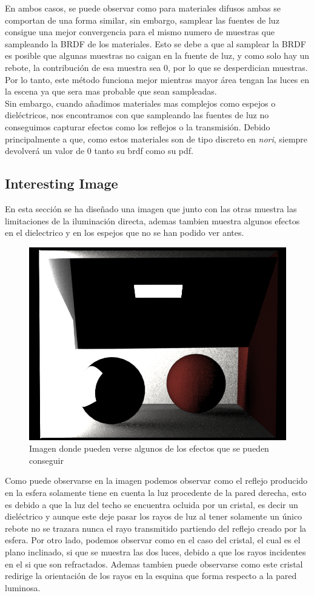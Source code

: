 \documentclass[10pt,oneside,a4paper]{article}
\begin{document}
 En ambos casos, se puede observar como para materiales difusos ambas se comportan de una forma similar, sin embargo, samplear las fuentes de luz consigue una mejor convergencia para el mismo numero de muestras que sampleando la BRDF de los materiales. Esto se debe a que al samplear la BRDF es posible que algunas muestras no caigan en la fuente de luz, y como solo hay un rebote, la contribución de esa muestra sea 0, por lo que se desperdician muestras. Por lo tanto, este método funciona mejor mientras mayor área tengan las luces en la escena ya que sera mas probable que sean sampleadas.\\
 
Sin embargo, cuando añadimos materiales mas complejos como espejos o dieléctricos, nos encontramos con que sampleando las fuentes de luz no conseguimos capturar efectos como los reflejos o la transmisión. Debido principalmente a que, como estos materiales son de tipo discreto en \textit{nori}, siempre devolverá un valor de 0 tanto su brdf como su pdf.\\
 
 \subsection{Interesting Image}
 En esta sección se ha diseñado una imagen que junto con las otras muestra las limitaciones de la iluminación directa, ademas tambien muestra algunos efectos en el dielectrico y en los espejos que no se han podido ver antes.\\
 
 \begin{figure}[h]
\centering
\includegraphics[width=.6\linewidth]{images/cbox_interesting_512.png}
\caption{Imagen donde pueden verse algunos de los efectos que se pueden conseguir}
\label{fig:disp}
\end{figure}
 
 Como puede observarse en la imagen podemos observar como el reflejo producido en la esfera solamente tiene en cuenta la luz procedente de la pared derecha, esto es debido a que la luz del techo se encuentra ocluida por un cristal, es decir un dieléctrico y aunque este deje pasar los rayos de luz al tener solamente un único rebote no se trazara nunca el rayo transmitido partiendo del reflejo creado por la esfera. Por otro lado, podemos observar como en el caso del cristal, el cual es el plano inclinado, si que se muestra las dos luces, debido a que los rayos incidentes en el si que son refractados. Ademas tambien puede observarse como este cristal redirige la orientación de los rayos en la esquina que forma respecto a la pared luminosa.
 
  
\end{document}
